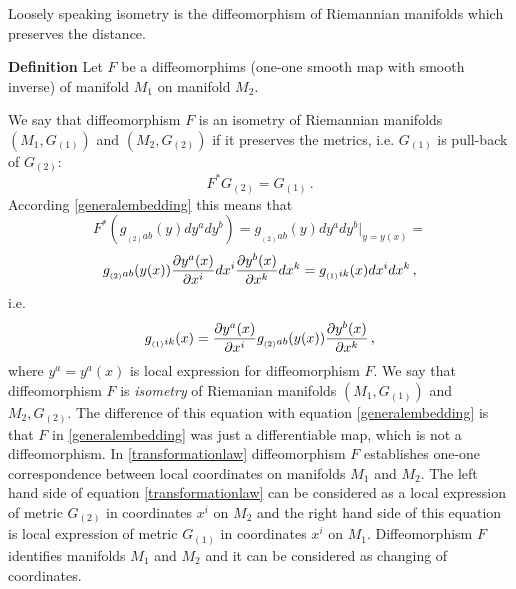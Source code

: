 \documentclass[12pt]{article}
\theoremstyle{theorem}
\numberwithin{equation}{section}
\begin{document}
Loosely  speaking isometry is the
diffeomorphism of Riemannian manifolds which preserves the distance.



{\bf Definition}
Let $F$ be a diffeomorphims (one-one smooth map with smooth inverse)
 of manifold $M_1$ on manifold $M_2$.


We say that diffeomorphism $F$ is an isometry of
Riemannian manifolds
 $(M_1,G_{(1)})$ and $(M_2,G_{(2)})$ 
if it  preserves the metrics, i.e.
$G_{(1)}$ is pull-back of $G_{(2)}$:
              \begin{equation}\label{pullback1}
            F^*G_{(2)}=G_{(1)}\,.
               \end{equation}
According \eqref{generalembedding} this means that  
                  $$
      F^*\left(g_{_{(2)}ab}(y)dy^a dy^b\right)=
       g_{_{(2)}ab}(y)dy^a dy^b\big\vert_{y=y(x)}=
                 $$
                \begin{equation*}\label{transformationlaw}
               g_{_{(2)}ab}(y(x))
   {\partial y^a(x)\over \partial x^i}dx^i{\partial y^b(x)\over \partial x^k}dx^k
   =g_{_{(1)}ik}(x)dx^idx^k\,,
               \end{equation*}
    i.e.  \begin{equation}\label{transformationlaw}
   g_{_{(1)}ik}(x)={\partial y^a(x)\over \partial x^i}g_{_{(2)}ab}(y(x))
        {\partial y^b(x)\over \partial x^k}\,,
                 \end{equation}
 where $y^a=y^a(x)$ is local expression for diffeomorphism  $F$.
We say that diffeomorphism $F$ is {\it isometry}
 of Riemanian manifolds
$(M_1, G_{(1)})$ and $M_2,G_{(2)}$.
The difference of this equation with equation
 \eqref{generalembedding} is that $F$ in 
\eqref{generalembedding}
was just a differentiable map, which is not a diffeomorphism.
  In \eqref{transformationlaw}   
diffeomorphism $F$ establishes one-one 
correspondence between local
coordinates on manifolds $M_1$ and $M_2$.
The left hand side of equation \eqref{transformationlaw} can be
considered as a local expression of metric $G_{(2)}$ in coordinates
$x^i$ on $M_2$ and the right hand side of this equation is local
expression of metric $G_{(1)}$ in coordinates $x^i$ on $M_1$.
Diffeomorphism $F$ identifies manifolds $M_1$ and $M_2$
and it can be considered as changing of coordinates.
\end{document}
